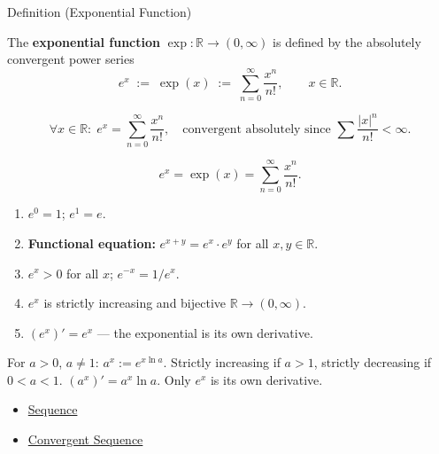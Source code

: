 \begin{definitionbox}{Definition (Exponential Function)}
\begin{definition}
\label{def:exponential}
The \textbf{exponential function} $\exp : \mathbb{R} \to (0,\infty)$
is defined by the absolutely convergent power series
\[
  e^x \;:=\; \exp(x) \;:=\; \sum_{n=0}^{\infty} \frac{x^n}{n!},
  \qquad x \in \mathbb{R}.
\]
\end{definition}
\end{definitionbox}

\begin{remark*}
\[
  \forall x \in \mathbb{R} :\;
  e^x = \sum_{n=0}^\infty \frac{x^n}{n!},
  \quad \text{convergent absolutely since }
  \sum \frac{|x|^n}{n!} < \infty.
\]
\end{remark*}

\begin{remark*}
\[
  e^x=\exp(x)=\sum_{n=0}^\infty \frac{x^n}{n!}.
\]
\end{remark*}

\begin{remark*}[Interpretation]
\begin{enumerate}[label=(\roman*)]
  \item $e^0 = 1$;\; $e^1 = e$.
  \item \textbf{Functional equation:} $e^{x+y} = e^x \cdot e^y$
    for all $x, y \in \mathbb{R}$.
  \item $e^x > 0$ for all $x$;\; $e^{-x} = 1/e^x$.
  \item $e^x$ is strictly increasing and bijective
    $\mathbb{R} \to (0,\infty)$.
  \item $(e^x)' = e^x$ --- the exponential is its own derivative.
\end{enumerate}


For $a > 0$, $a \neq 1$: $a^x := e^{x\ln a}$. Strictly increasing
if $a > 1$, strictly decreasing if $0 < a < 1$. $(a^x)' = a^x \ln a$.
Only $e^x$ is its own derivative.
\end{remark*}

\begin{dependencies}
\begin{itemize}
  \item \hyperref[def:sequence]{Sequence}
  \item \hyperref[def:convergent-sequence]{Convergent Sequence}
\end{itemize}
\end{dependencies}

